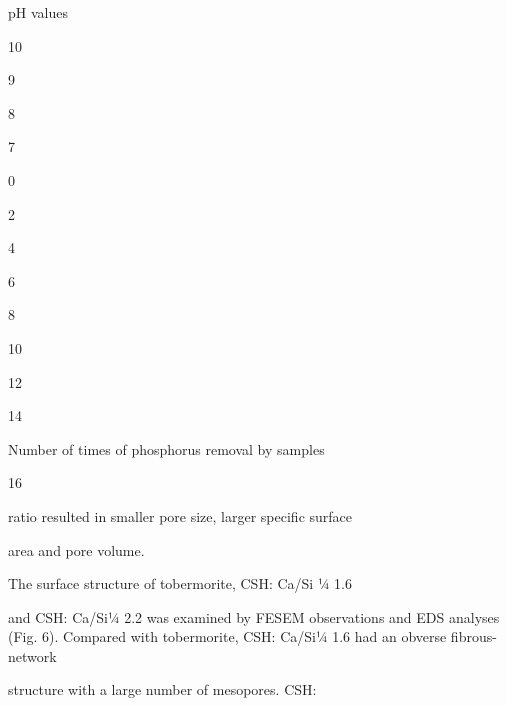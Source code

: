 \documentclass[a4paper,portrait,12pt]{article}
\begin{document}
\begin{flushleft}
pH values
\end{flushleft}





10





9





8





7





0





2


4


6


8


10


12


14


\begin{flushleft}
Number of times of phosphorus removal by samples
\end{flushleft}





16





\begin{flushleft}
ratio resulted in smaller pore size, larger speciﬁc surface
\end{flushleft}


\begin{flushleft}
area and pore volume.
\end{flushleft}


\begin{flushleft}
The surface structure of tobermorite, CSH: Ca/Si ¼ 1.6
\end{flushleft}


\begin{flushleft}
and CSH: Ca/Si¼ 2.2 was examined by FESEM observations and EDS analyses (Fig. 6). Compared with tobermorite, CSH: Ca/Si¼ 1.6 had an obverse ﬁbrous-network
\end{flushleft}


\begin{flushleft}
structure with a large number of mesopores. CSH:
\end{flushleft}
\end{document}
